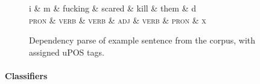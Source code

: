 \documentclass[11pt,letterpaper]{article}
\let\tag=\textsc
\begin{document}
\begin{figure}
\begin{center}
\begin{dependency}
  \begin{deptext}[column sep=.2cm]
    i \& m \& fucking \& scared \& kill \& them \& d\\
   \tag{\smaller pron} \& \tag{\smaller verb} \& \tag{\smaller verb} \& \tag{\smaller adj} \& \tag{\smaller verb} \& \tag{\smaller pron} \& \tag{\smaller x} \\
  \end{deptext}
\end{dependency}
\caption{Dependency parse of example sentence from the corpus, with assigned uPOS tags.}
\label{fig:dep}
\end{center}
\end{figure}





\paragraph{Classifiers}
\end{document}
